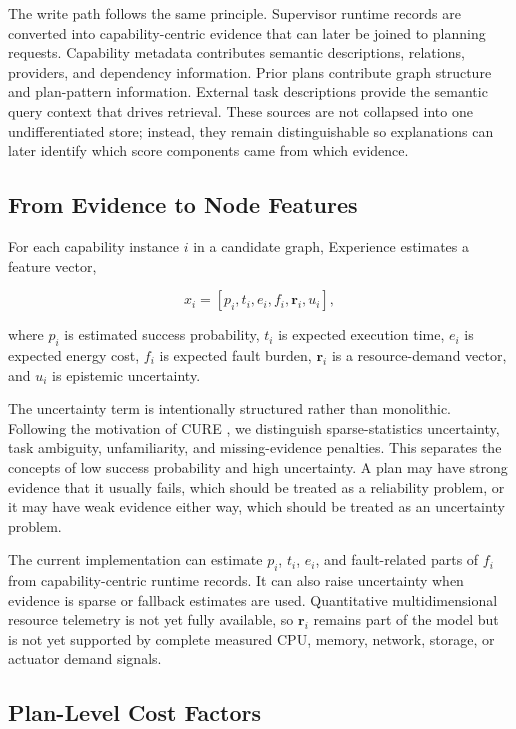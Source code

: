 \documentclass[letterpaper, 10pt, conference]{ieeeconf}
\begin{document}
The write path follows the same principle. Supervisor runtime records are converted into capability-centric evidence that can later be joined to planning requests. Capability metadata contributes semantic descriptions, relations, providers, and dependency information. Prior plans contribute graph structure and plan-pattern information. External task descriptions provide the semantic query context that drives retrieval. These sources are not collapsed into one undifferentiated store; instead, they remain distinguishable so explanations can later identify which score components came from which evidence.

\subsection{From Evidence to Node Features}

For each capability instance $i$ in a candidate graph, Experience estimates a feature vector,

\begin{equation}
x_i = [p_i, t_i, e_i, f_i, \mathbf{r}_i, u_i],
\end{equation}

where $p_i$ is estimated success probability, $t_i$ is expected execution time, $e_i$ is expected energy cost, $f_i$ is expected fault burden, $\mathbf{r}_i$ is a resource-demand vector, and $u_i$ is epistemic uncertainty.

The uncertainty term is intentionally structured rather than monolithic. Following the motivation of CURE \cite{yin2025reliablellmbasedrobotplanning}, we distinguish sparse-statistics uncertainty, task ambiguity, unfamiliarity, and missing-evidence penalties. This separates the concepts of low success probability and high uncertainty. A plan may have strong evidence that it usually fails, which should be treated as a reliability problem, or it may have weak evidence either way, which should be treated as an uncertainty problem.

The current implementation can estimate $p_i$, $t_i$, $e_i$, and fault-related parts of $f_i$ from capability-centric runtime records. It can also raise uncertainty when evidence is sparse or fallback estimates are used. Quantitative multidimensional resource telemetry is not yet fully available, so $\mathbf{r}_i$ remains part of the model but is not yet supported by complete measured CPU, memory, network, storage, or actuator demand signals.

\subsection{Plan-Level Cost Factors}
\end{document}
